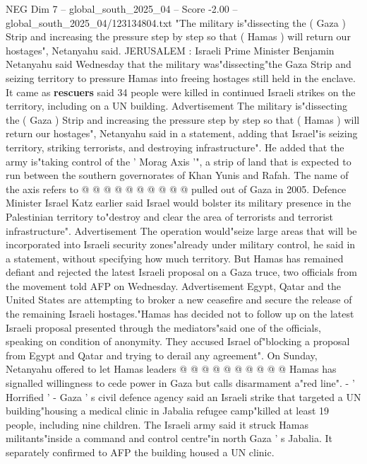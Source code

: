\begin{textsample}{NEG Dim 7 – global\_south\_2025\_04 – Score -2.00 – global\_south\_2025\_04/123134804.txt}  \label{ex:f7_neg_050}
"The military is"dissecting the ( Gaza ) Strip and increasing the pressure step by step so that ( Hamas ) will return our hostages", Netanyahu said.
JERUSALEM : Israeli Prime Minister Benjamin Netanyahu said Wednesday that the military was"dissecting"the Gaza Strip and seizing territory to pressure Hamas into freeing hostages still held in the enclave.
It came as \textbf{rescuers} said 34 people were killed in continued Israeli strikes on the territory, including on a UN building.
Advertisement The military is"dissecting the ( Gaza ) Strip and increasing the pressure step by step so that ( Hamas ) will return our hostages", Netanyahu said in a statement, adding that Israel"is seizing territory, striking terrorists, and destroying infrastructure".
He added that the army is"taking control of the ' Morag Axis '", a strip of land that is expected to run between the southern governorates of Khan Yunis and Rafah.
The name of the axis refers to @ @ @ @ @ @ @ @ @ @ pulled out of Gaza in 2005.
Defence Minister Israel Katz earlier said Israel would bolster its military presence in the Palestinian territory to"destroy and clear the area of terrorists and terrorist infrastructure".
Advertisement The operation would"seize large areas that will be incorporated into Israeli security zones"already under military control, he said in a statement, without specifying how much territory.
But Hamas has remained defiant and rejected the latest Israeli proposal on a Gaza truce, two officials from the movement told AFP on Wednesday.
Advertisement Egypt, Qatar and the United States are attempting to broker a new ceasefire and secure the release of the remaining Israeli hostages."Hamas has decided not to follow up on the latest Israeli proposal presented through the mediators"said one of the officials, speaking on condition of anonymity.
They accused Israel of"blocking a proposal from Egypt and Qatar and trying to derail any agreement".
On Sunday, Netanyahu offered to let Hamas leaders @ @ @ @ @ @ @ @ @ @ Hamas has signalled willingness to cede power in Gaza but calls disarmament a"red line". - ' Horrified ' - Gaza ' s civil defence agency said an Israeli strike that targeted a UN building"housing a medical clinic in Jabalia refugee camp"killed at least 19 people, including nine children.
The Israeli army said it struck Hamas militants"inside a command and control centre"in north Gaza ' s Jabalia.
It separately confirmed to AFP the building housed a UN clinic.

\end{textsample}
